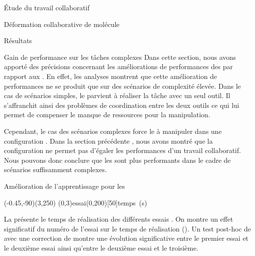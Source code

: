 \documentclass[myfrancais]{mythesis}
\begin{document}
\begin{mypart}{Étude du travail collaboratif}
\begin{mychapter}{Déformation collaborative de molécule}
\begin{mysection}{Résultats}
\begin{mysubsection}{Gain de performance sur les tâches complexes}
					Dans cette section, nous avons apporté des précisions concernant les améliorations de performances des  par rapport aux .
					En effet, les analyses montrent que cette amélioration de performances ne se produit que sur des scénarios de complexité élevée.
					Dans le cas de scénarios simples, le  parvient à réaliser la tâche avec un seul outil.
					Il s'affranchit ainsi des problèmes de coordination entre les deux outils ce qui lui permet de compenser le manque de ressources pour la manipulation.

					Cependant, le cas des scénarios complexes force le  à manipuler dans une configuration .
					Dans la section précédente , nous avons montré que la configuration  ne permet pas d'égaler les performances d'un travail collaboratif.
					Nous pouvons donc conclure que les  sont plus performants dans le cadre de scénarios suffisamment complexes.
				\end{mysubsection}
				\begin{mysubsection}{Amélioration de l'apprentissage pour les }
					\begin{myfigure}
						\begin{myps}(-0.45,-90)(3,250)
							\myaxes(0,3){essai}(0,200)[50]{temps~(s)}
						\end{myps}
					\end{myfigure}

					La  présente le temps de réalisation  des différents essais .
					On montre un effet significatif du numéro de l'essai  sur le temps de réalisation  ().
					Un test post-hoc de  avec une correction de  montre une évolution significative entre le premier essai et le deuxième essai ainsi qu'entre le deuxième essai et le troisième.


\end{mysubsection}
\end{mysection}
\end{mychapter}
\end{mypart}
\end{document}

